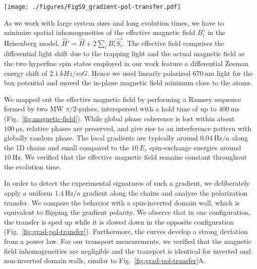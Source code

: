 \documentclass[
 reprint,
 superscriptaddress,
 amsmath,amssymb,
 aps,
 pra,
]{revtex4-2}
\begin{document}
\begin{figure*}
    \centering
    \texttt{[image: ./figures/FigS9\_gradient-pol-transfer.pdf]}
    \caption{\textbf{Polarization transfer with magnetic gradient.}
        Polarization transfer of pure domain walls at a lattice depth of $8\,E_r$. The two colors indicate mutually inverted domain walls (i.e. $\left|\downarrow\right>$ atoms are on the left or on the right side).
        (\textbf{A}) For minimized magnetic gradient, both spin configuration display identical behavior.
        (\textbf{B}) At a magnetic gradient of $\SI{1.4}{\hertz}/a \sim 0.05 J/a$, a strong difference is visible. Due to the gradient, one initial state constitutes a relatively low-energy state, while the other state has high energy. The low-energy state remains largely localized and has a suppressed polarization transfer.
    }
    \label{fig:grad-pol-transfer}
\end{figure*}

As we work with large system sizes and long evolution times, we have to minimize spatial inhomogeneities of the effective magnetic field $B_i^z$ in the Heisenberg model, $\hat{H}' = \hat{H} + 2 \sum_i B_i^z \hat{S}_i^z$. The effective field comprises the differential light shift due to the trapping light and the actual magnetic field as the two hyperfine spin states employed in our work feature a differential Zeeman energy shift of $\SI{2.1}{kHz/mG}$. Hence we used linearly polarized $\SI{670}{\nano\metre}$ light for the box potential and moved the in-plane magnetic field minimum close to the atoms.

We mapped out the effective magnetic field by performing a Ramsey sequence formed by two MW $\pi/2$-pulses, interspersed with a hold time of up to $\SI{400}{\milli\second}$ (Fig.~\ref{fig:magnetic-field}). While global phase coherence is lost within about $\SI{100}{\micro\second}$, relative phases are preserved, and give rise to an interference pattern with globally random phase. The local gradients are typically around $\SI{0.04}{\hertz}/a$ along the 1D chains and small compared to the $10\,E_r$ spin-exchange energies around $\SI{10}{\hertz}$.
We verified that the effective magnetic field remains constant throughout the evolution time.

In order to detect the experimental signatures of such a gradient, we deliberately apply a uniform $\SI{1.4}{\hertz}/a$ gradient along the chains and analyze the polarization transfer. We compare the behavior with a spin-inverted domain wall, which is equivalent to flipping the gradient polarity. We observe that in one configuration, the transfer is sped up while it is slowed down in the opposite configuration (Fig.~\ref{fig:grad-pol-transfer}). Furthermore, the curves develop a strong deviation from a power law. For our transport measurements, we verified that the magnetic field inhomogeneities are negligible and the transport is identical for inverted and non-inverted domain walls, similar to Fig.~\ref{fig:grad-pol-transfer}A.
\end{document}
